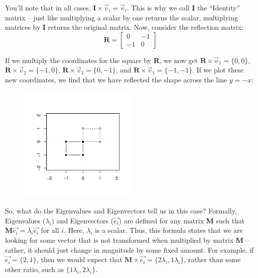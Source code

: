 \documentclass[12pt]{article}
\begin{document}
You'll note that in all cases, $\textbf{I}\times\overrightarrow{v}_{i} = \overrightarrow{v}_{i}$. This is why we call \textbf{I} the ``Identity'' matrix -- just like multiplying a scalar by one returns the scalar, multiplying matrices by \textbf{I} returns the original matrix. Now, consider the reflection matrix:
\begin{equation}
\textbf{R}=
\begin{bmatrix}
0 & -1 \\
-1 & 0
\end{bmatrix}
\end{equation}

If we multiply the coordinates for the square by \textbf{R}, we now get $\textbf{R}\times\overrightarrow{v}_{1} = \{0,0\}$, $\textbf{R}\times\overrightarrow{v}_{2} = \{-1,0\}$, $\textbf{R}\times\overrightarrow{v}_{3} = \{0,-1\}$, and $\textbf{R}\times\overrightarrow{v}_{1} = \{-1,-1\}$. If we plot these new coordinates, we find that we have reflected the shape across the line $y=-x$:

\begin{figure}[H]
  \centering
  \includegraphics[width=0.5\textwidth, page=1]{figures/Eigen2}
\end{figure}

So, what do the Eigenvalues and Eigenvectors tell us in this case? Formally, Eigenvalues ($\lambda_{i}$) and Eigenvectors ($\overrightarrow{e_{i}}$) are defined for any matrix \textbf{M} such that $\textbf{M}\overrightarrow{e_{i}} = \lambda_{i}\overrightarrow{e_{i}}$ for all $i$. Here, $\lambda_{i}$ is a scalar. Thus, this formula states that we are looking for some vector that is not transformed when multiplied by matrix \textbf{M} -- rather, it should just change in magnitude by some fixed amount. For example, if $\overrightarrow{e_{i}} = \{2,1\}$, then we would expect that $\textbf{M}\times\overrightarrow{e_{i}} = \{2\lambda_{i},1\lambda_{i}\}$, rather than some other ratio, such as $\{1\lambda_{i},2\lambda_{i}\}$.
\end{document}

